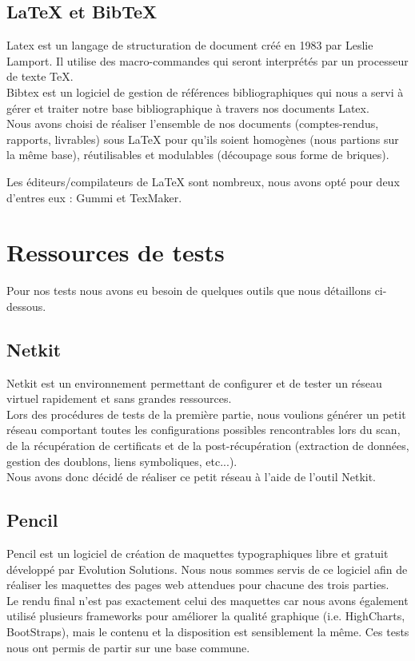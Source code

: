 \subsection{LaTeX et BibTeX}

Latex est un langage de structuration de document créé en 1983 par Leslie Lamport. Il utilise des macro-commandes qui seront interprétés par un processeur de texte TeX.\\
Bibtex est un logiciel de gestion de références bibliographiques qui nous a servi à gérer et traiter notre base bibliographique à travers nos documents Latex.\\

Nous avons choisi de réaliser l'ensemble de nos documents (comptes-rendus, rapports, livrables) sous LaTeX pour qu'ils soient homogènes (nous partions sur la même base), réutilisables et modulables (découpage sous forme de briques).

Les éditeurs/compilateurs de LaTeX sont nombreux, nous avons opté pour deux d'entres eux : Gummi et TexMaker.

\section{Ressources de tests}

Pour nos tests nous avons eu besoin de quelques outils que nous détaillons ci-dessous.

\subsection{Netkit}

Netkit est un environnement permettant de configurer et de tester un réseau virtuel rapidement et sans grandes ressources.\\
Lors des procédures de tests de la première partie, nous voulions générer un petit réseau comportant toutes les configurations possibles rencontrables lors du scan, de la récupération de certificats et de la post-récupération (extraction de données, gestion des doublons, liens symboliques, etc...).\\
Nous avons donc décidé de réaliser ce petit réseau à l'aide de l'outil Netkit.

\subsection{Pencil}

Pencil est un logiciel de création de maquettes typographiques libre et gratuit développé par Evolution Solutions.
Nous nous sommes servis de ce logiciel afin de réaliser les maquettes des pages web attendues pour chacune des trois parties.\\
Le rendu final n'est pas exactement celui des maquettes car nous avons également utilisé plusieurs frameworks pour améliorer la qualité graphique (i.e. HighCharts, BootStraps), mais le contenu et la disposition est sensiblement la même.
Ces tests nous ont permis de partir sur une base commune.


